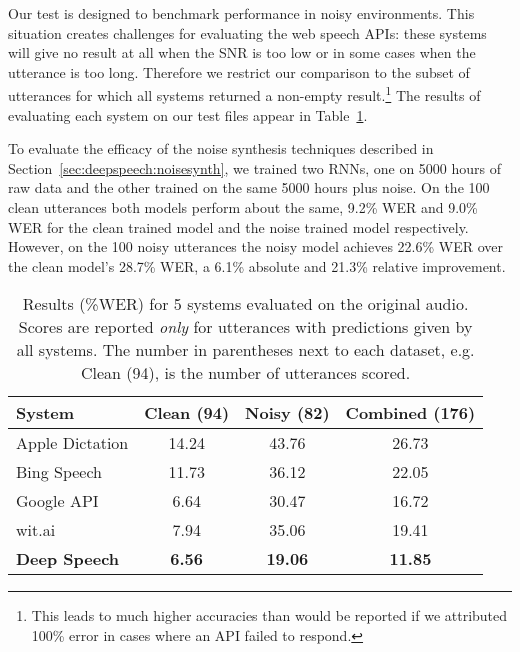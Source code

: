 Our test is designed to benchmark performance in noisy environments. This
situation creates challenges for evaluating the web speech APIs: these systems
will give no result at all when the SNR is too low or in some cases when the
utterance is too long. Therefore we restrict our comparison to the subset of
utterances for which all systems returned a non-empty result.\footnote{This
leads to much higher accuracies than would be reported if we attributed 100\%
error in cases where an API failed to respond.} The results of evaluating each
system on our test files appear in Table~\ref{table:deepspeech:originalaudio}.  

To evaluate the efficacy of the noise synthesis techniques described in
Section~\ref{sec:deepspeech:noisesynth}, we trained two RNNs, one on 5000 hours
of raw data and the other trained on the same 5000 hours plus noise. On the 100
clean utterances both models perform about the same, 9.2\% WER and 9.0\% WER
for the clean trained model and the noise trained model respectively. However,
on the 100 noisy utterances the noisy model achieves 22.6\% WER over the clean
model's 28.7\% WER, a 6.1\% absolute and 21.3\% relative improvement.

\begin{table}[ht!]
\centering
\begin{tabular}{l  c  c  c}
\toprule
System      &  Clean (94) &  Noisy (82) & Combined (176) \\
\midrule
Apple Dictation  & 14.24   & 43.76  & 26.73 \\
Bing Speech      &  11.73     &   36.12   &  22.05   \\
Google API       &  6.64   & 30.47  & 16.72 \\
wit.ai           &  7.94   & 35.06  & 19.41 \\
{\bf Deep Speech}       &  {\bf 6.56}   & {\bf 19.06}  & {\bf 11.85} \\
\bottomrule
\end{tabular}
\caption{Results (\%WER) for 5 systems evaluated on the original audio. Scores
         are reported {\it only} for utterances with predictions given by all
         systems. The number in parentheses next to each dataset, e.g. Clean (94),
         is the number of utterances scored.}
\label{table:deepspeech:originalaudio}
\end{table}



